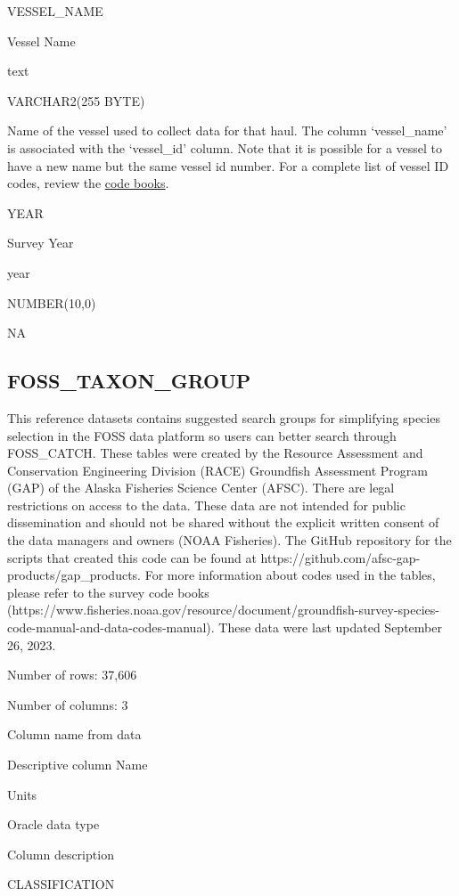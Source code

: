 \documentclass[
  letterpaper,
  oneside,
  open=any]{scrbook}
\begin{document}
VESSEL\_NAME

Vessel Name

text

VARCHAR2(255 BYTE)

Name of the vessel used to collect data for that haul. The column
`vessel\_name' is associated with the `vessel\_id' column. Note that it
is possible for a vessel to have a new name but the same vessel id
number. For a complete list of vessel ID codes, review the
\href{https://www.fisheries.noaa.gov/resource/document/groundfish-survey-species-code-manual-and-data-codes-manual}{code
books}.

YEAR

Survey Year

year

NUMBER(10,0)

NA

\hypertarget{foss_taxon_group}{%
\subsection{FOSS\_TAXON\_GROUP}\label{foss_taxon_group}}

This reference datasets contains suggested search groups for simplifying
species selection in the FOSS data platform so users can better search
through FOSS\_CATCH. These tables were created by the Resource
Assessment and Conservation Engineering Division (RACE) Groundfish
Assessment Program (GAP) of the Alaska Fisheries Science Center (AFSC).
There are legal restrictions on access to the data. These data are not
intended for public dissemination and should not be shared without the
explicit written consent of the data managers and owners (NOAA
Fisheries). The GitHub repository for the scripts that created this code
can be found at https://github.com/afsc-gap-products/gap\_products. For
more information about codes used in the tables, please refer to the
survey code books
(https://www.fisheries.noaa.gov/resource/document/groundfish-survey-species-code-manual-and-data-codes-manual).
These data were last updated September 26, 2023.

Number of rows: 37,606

Number of columns: 3

Column name from data

Descriptive column Name

Units

Oracle data type

Column description

CLASSIFICATION
\end{document}
